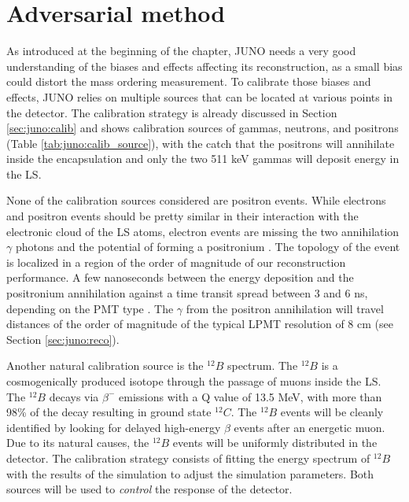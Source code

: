 \documentclass[../main.tex]{subfiles}
\begin{document}
\section{Adversarial method}
\label{sec:janne:method}

As introduced at the beginning of the chapter, JUNO needs a very good understanding of the biases and effects affecting its reconstruction, as a small bias could distort the mass ordering measurement. To calibrate those biases and effects, JUNO relies on multiple sources that can be located at various points in the detector. The calibration strategy is already discussed in Section \ref{sec:juno:calib} and shows calibration sources of gammas, neutrons, and positrons (Table \ref{tab:juno:calib_source}), with the catch that the positrons will annihilate inside the encapsulation and only the two 511 keV gammas will deposit energy in the LS.

None of the calibration sources considered are positron events. While electrons and positron events should be pretty similar in their interaction with the electronic cloud of the LS atoms, electron events are missing the two annihilation $\gamma$ photons and the potential of forming a positronium \cite{schwarz_measurements_2018}. The topology of the event is localized in a region of the order of magnitude of our reconstruction performance. A few nanoseconds between the energy deposition and the positronium annihilation against a time transit spread between 3 and 6 ns, depending on the PMT type \cite{rodphai_20-inch_2021, liao_study_2017, li_characterization_2018}. The $\gamma$ from the positron annihilation will travel distances of the order of magnitude of the typical LPMT resolution of 8 cm (see Section \ref{sec:juno:reco}).

Another natural calibration source is the $^{12}B$ spectrum. The $^{12}B$ is a cosmogenically produced isotope through the passage of muons inside the LS. The $^{12}B$ decays via $\beta^-$ emissions with a Q value of 13.5 MeV, with more than 98\% of the decay resulting in ground state $^{12}C$. The $^{12}B$ events will be cleanly identified by looking for delayed high-energy $\beta$ events after an energetic muon. Due to its natural causes, the $^{12}B$ events will be uniformly distributed in the detector. The calibration strategy consists of fitting the energy spectrum of $^{12}B$ with the results of the simulation to adjust the simulation parameters. Both sources will be used to \textit{control} the response of the detector.
\end{document}
